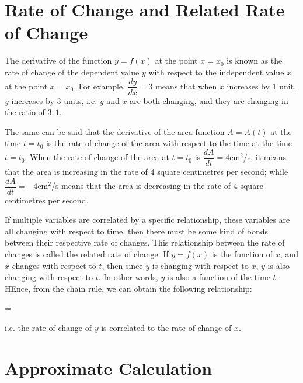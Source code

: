 


\section{Rate of Change and Related Rate of Change}

The derivative of the function $y = f(x)$ at the point $x = x_0$ is known as
the rate of change of the dependent value $y$ with respect to the independent
value $x$ at the point $x = x_0$. For example, $\dfrac{d y}{d x} = 3$ means
that when $x$ increases by $1$ unit, $y$ increases by $3$ units, i.e. $y$ and
$x$ are both changing, and they are changing in the ratio of $3:1$.

The same can be said that the derivative of the area function $A = A(t)$ at the
time $t = t_0$ is the rate of change of the area with respect to the time at
the time $t = t_0$. When the rate of change of the area at $t = t_0$ is
$\dfrac{d A}{d t} = 4$cm$^2$/s, it means that the area is increasing in the
rate of 4 square centimetres per second; while $\dfrac{d A}{d t} = -4$cm$^2$/s
means that the area is decreasing in the rate of 4 square centimetres per
second.

If multiple variables are correlated by a specific relationship, these
variables are all changing with respect to time, then there must be some kind
of bonds between their respective rate of changes. This relationship between
the rate of changes is called the related rate of change. If $y = f(x)$ is the
function of $x$, and $x$ changes with respect to $t$, then since $y$ is
changing with respect to $x$, $y$ is also changing with respect to $t$. In
other words, $y$ is also a function of the time $t$. HEnce, from the chain
rule, we can obtain the following relationship:
\begin{cequation}
     =  \cdot {}
\end{cequation}
i.e. the rate of change of $y$ is correlated to the rate of change of $x$.




\section{Approximate Calculation}

